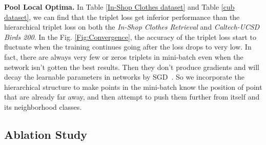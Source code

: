 \documentclass[runningheads]{llncs}
\begin{document}
\noindent\textbf{Pool Local Optima.} In Table \ref{In-Shop Clothes dataset} and Table \ref{cub dataset}, we can find that the triplet loss get inferior performance than the hierarchical triplet loss on both the \emph{In-Shop Clothes Retrieval} and  \emph{Caltech-UCSD Birds 200}. In the Fig. \ref{Fig:Convergence}, the accuracy of the triplet loss start to fluctuate when the training continues going after the loss drops to very low. In fact, there are always very few or zeros triplets in mini-batch even when the network isn't gotten the best results. Then they don't produce gradients and will decay the learnable parameters in networks by SGD~\cite{orr2003neural}. So we incorporate the hierarchical structure to make points in the mini-batch know the position of point that are already far away, and then attempt to push them further from itself and its neighborhood classes. 



\subsection{Ablation Study}
\end{document}
